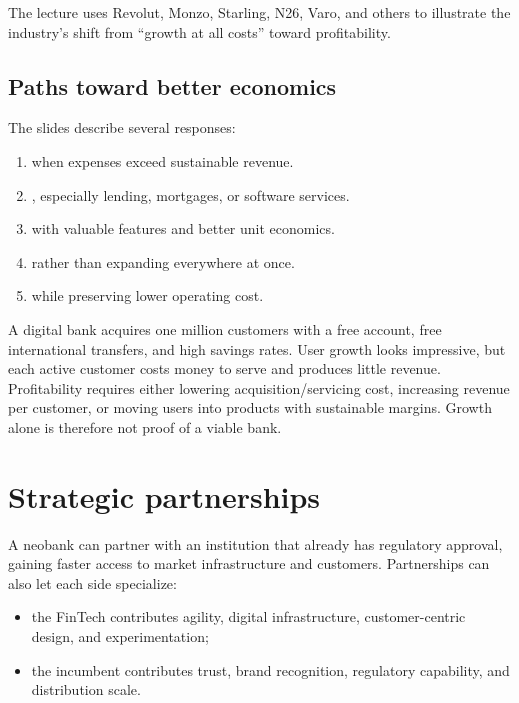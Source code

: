 The lecture uses Revolut, Monzo, Starling, N26, Varo, and others to illustrate the industry's shift from ``growth at all costs'' toward profitability.

\subsection{Paths toward better economics}

The slides describe several responses:

\begin{enumerate}
  \item {} when expenses exceed sustainable revenue.
  \item {}, especially lending, mortgages, or software services.
  \item {} with valuable features and better unit economics.
  \item {} rather than expanding everywhere at once.
  \item {} while preserving lower operating cost.
\end{enumerate}

\begin{workedexample}
A digital bank acquires one million customers with a free account, free international transfers, and high savings rates. User growth looks impressive, but each active customer costs money to serve and produces little revenue. Profitability requires either lowering acquisition/servicing cost, increasing revenue per customer, or moving users into products with sustainable margins. Growth alone is therefore not proof of a viable bank.
\end{workedexample}

\section{Strategic partnerships}

A neobank can partner with an institution that already has regulatory approval, gaining faster access to market infrastructure and customers. Partnerships can also let each side specialize:

\begin{itemize}
  \item the FinTech contributes agility, digital infrastructure, customer-centric design, and experimentation;
  \item the incumbent contributes trust, brand recognition, regulatory capability, and distribution scale.
\end{itemize}


